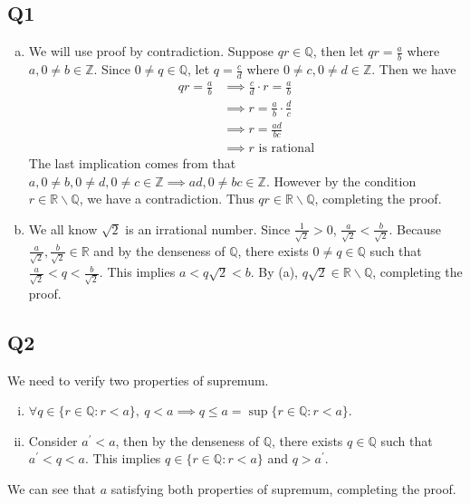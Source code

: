 \documentclass[12pt,lettersize]{article}
\newcommand{\R}{\mathbb{R}}
\newcommand{\Q}{\mathbb{Q}}
\newcommand{\Z}{\mathbb{Z}}
\begin{document}
\subsection*{Q1}
\begin{enumerate}[(a)]
	\item We will use proof by contradiction. Suppose $qr\in\Q$, then let $qr=\frac{a}{b}$ where $a,0\neq b\in\Z$. Since $0\neq q\in\Q$, let $q=\frac{c}{d}$ where $0\neq c, 0\neq d\in\Z$. Then we have
	\begin{align*}
		qr=\frac{a}{b} &\implies \frac{c}{d}\cdot r=\frac{a}{b}\\
					   &\implies r=\frac{a}{b}\cdot\frac{d}{c}\\
					   &\implies r=\frac{ad}{bc}\\
					   &\implies \text{$r$ is rational}
	\end{align*}
	The last implication comes from that $a,0\neq b, 0\neq d,0\neq c\in\Z\implies ad,0\neq bc\in\Z$. However by the condition $r\in\R\backslash\Q$, we have a contradiction. Thus $qr\in\R\backslash\Q$, completing the proof.
	\item We all know $\sqrt{2}$ is an irrational number. Since $\frac{1}{\sqrt{2}}>0$, $\frac{a}{\sqrt{2}}<\frac{b}{\sqrt{2}}$. Because $\frac{a}{\sqrt{2}},\frac{b}{\sqrt{2}}\in\R$ and by the denseness of $\Q$, there exists $0\neq q\in\Q$ such that $\frac{a}{\sqrt{2}}<q<\frac{b}{\sqrt{2}}$. This implies $a<q\sqrt{2}<b$. By (a), $q\sqrt{2}\in\R\backslash\Q$, completing the proof. 
\end{enumerate}

\newpage

\subsection*{Q2}

We need to verify two properties of supremum. 
\begin{enumerate}[(i)]
	\item $\forall q\in\{r\in\Q: r<a\},\ q<a\implies q\leq a=\sup\{r\in\Q: r<a\}$.
	\item Consider $a^\prime<a$, then by the denseness of $\Q$, there exists $q\in\Q$ such that $a^\prime<q<a$. This implies $q\in\{r\in\Q: r<a\}$ and $q>a^\prime$. 	
\end{enumerate}
We can see that $a$ satisfying both properties of supremum, completing the proof.
\newpage
\end{document}
